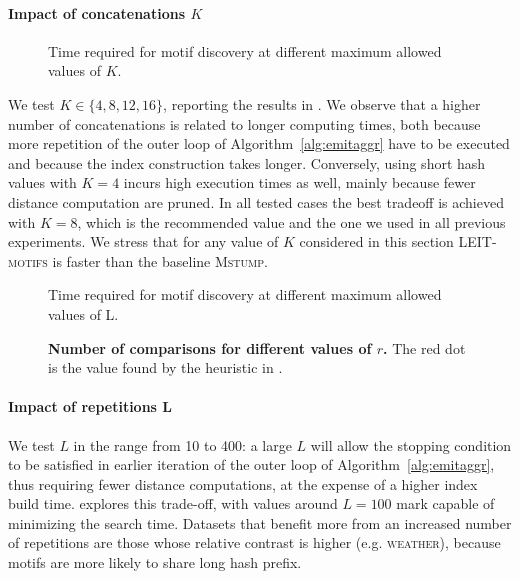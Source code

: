 \paragraph{Impact of concatenations $K$}
\begin{figure}[t]
    \centering
    \caption{Time required for motif discovery at different maximum allowed values of $K$.}
    \label{fig:K_graphs}
\end{figure}
We test $K\in\{4,8,12,16\}$, reporting the results in .
We observe that a higher number of concatenations is related to longer computing times,
both because more repetition of the outer loop of Algorithm~\ref{alg:emitaggr} have to be executed and because the index construction takes longer.
Conversely, using short hash values with $K=4$ incurs high execution times as well, mainly because fewer distance computation are pruned.
In all tested cases the best tradeoff is achieved with $K=8$, which is the recommended value and the one we used in all previous experiments.
We stress that for any value of $K$ considered in this section \textsc{LEIT-motifs} is faster than the baseline \textsc{Mstump}.


\begin{figure}[t]
    \centering
    \caption{Time required for motif discovery at different maximum allowed values of L.}
    \label{fig:l_graphs}
\end{figure}
    
\begin{figure}[t]
    \centering
    \caption{\textbf{Number of comparisons for different values of $r$.} The red dot is the value found by the heuristic in .}
    \label{fig:r_graphs}
\end{figure}

\paragraph{Impact of repetitions L}
We test $L$ in the range from 10 to 400:
a large $L$ will allow the stopping condition to be satisfied in earlier iteration of the outer loop of Algorithm~\ref{alg:emitaggr}, thus requiring fewer distance computations, at the expense of a higher index build time.
 explores this trade-off, with values around $L=100$ mark capable of minimizing the search time.
Datasets that benefit more from an increased number of repetitions are those whose relative contrast is higher (e.g. \textsc{weather}), because motifs are more likely to share long hash prefix.

